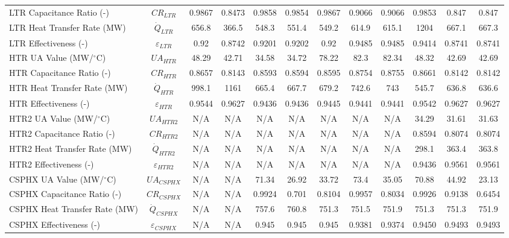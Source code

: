 \begin{specialtable}[H]
{\begin{tabular}{lccccccccccc}
    LTR Capacitance Ratio (-)	&	$CR_{LTR}$	&	0.9867	&	0.8473	&	0.9858	&	0.9854	&	0.9867	&	0.9066	&	0.9066	&	0.9853	&	0.847	&	0.847	\\
    LTR Heat Transfer Rate (MW)	&	$\dot{Q}_{LTR}$	&	656.8	&	366.5	&	548.3	&	551.4	&	549.2	&	614.9	&	615.1	&	1204	&	667.1	&	667.3	\\
    LTR Effectiveness (-)	&	$\varepsilon_{LTR}$	&	0.92	&	0.8742	&	0.9201	&	0.9202	&	0.92	&	0.9485	&	0.9485	&	0.9414	&	0.8741	&	0.8741	\\
    HTR UA Value (MW/$^{\circ}$C)	&	$UA_{HTR}$	&	48.29	&	42.71	&	34.58	&	34.72	&	78.22	&	82.3	&	82.34	&	48.32	&	42.69	&	42.69	\\
    HTR Capacitance Ratio (-)	&	$CR_{HTR}$	&	0.8657	&	0.8143	&	0.8593	&	0.8594	&	0.8595	&	0.8754	&	0.8755	&	0.8661	&	0.8142	&	0.8142	\\
    HTR Heat Transfer Rate (MW)	&	$\dot{Q}_{HTR}$	&	998.1	&	1161	&	665.4	&	667.7	&	679.2	&	742.6	&	743	&	545.7	&	636.8	&	636.6	\\
    HTR Effectiveness (-)	&	$\varepsilon_{HTR}$	&	0.9544	&	0.9627	&	0.9436	&	0.9436	&	0.9445	&	0.9441	&	0.9441	&	0.9542	&	0.9627	&	0.9627	\\
    HTR2 UA Value (MW/$^{\circ}$C)	&	$UA_{HTR2}$	&	N/A	&	N/A	&	N/A	&	N/A	&	N/A	&	N/A	&	N/A	&	34.29	&	31.61	&	31.63	\\
    HTR2 Capacitance Ratio (-)	&	$CR_{HTR2}$	&	N/A	&	N/A	&	N/A	&	N/A	&	N/A	&	N/A	&	N/A	&	0.8594	&	0.8074	&	0.8074	\\
    HTR2 Heat Transfer Rate (MW)	&	$\dot{Q}_{HTR2}$	&	N/A	&	N/A	&	N/A	&	N/A	&	N/A	&	N/A	&	N/A	&	298.1	&	363.4	&	363.8	\\
    HTR2 Effectiveness (-)	&	$\varepsilon_{HTR2}$	&	N/A	&	N/A	&	N/A	&	N/A	&	N/A	&	N/A	&	N/A	&	0.9436	&	0.9561	&	0.9561	\\
    CSPHX UA Value (MW/$^{\circ}$C)	&	$UA_{CSPHX}$	&	N/A	&	N/A	&	71.34	&	26.92	&	33.72	&	73.4	&	35.05	&	70.88	&	44.92	&	23.13	\\
    CSPHX Capacitance Ratio (-)	&	$CR_{CSPHX}$	&	N/A	&	N/A	&	0.9924	&	0.701	&	0.8104	&	0.9957	&	0.8034	&	0.9926	&	0.9138	&	0.6454	\\
    CSPHX Heat Transfer Rate (MW)	&	$\dot{Q}_{CSPHX}$	&	N/A	&	N/A	&	757.6	&	760.8	&	751.3	&	751.5	&	751.9	&	751.3	&	751.3	&	751.9	\\
    CSPHX Effectiveness (-)	&	$\varepsilon_{CSPHX}$	&	N/A	&	N/A	&	0.945	&	0.945	&	0.945	&	0.9381	&	0.9374	&	0.9450	&	0.9493	&	0.9493	\\
    \bottomrule
    \end{tabular}
    }
\end{specialtable}
